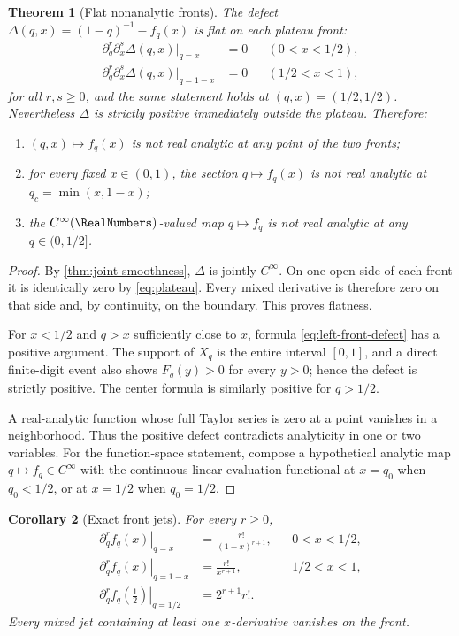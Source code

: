 \documentclass[11pt,oneside]{article}
\newtheorem{theorem}{Theorem}[section]
\newtheorem{corollary}[theorem]{Corollary}
\theoremstyle{definition}
\theoremstyle{remark}
\begin{document}
\begin{theorem}[Flat nonanalytic fronts]
\label{thm:flat-fronts}
The defect \(\Delta(q,x)=(1-q)^{-1}-f_q(x)\) is flat on each plateau front:
\begin{align}
 \partial_q^r\partial_x^s\Delta(q,x)\big|_{q=x}&=0
 &&(0<x<1/2),
 \label{eq:left-front-flat}\\
 \partial_q^r\partial_x^s\Delta(q,x)\big|_{q=1-x}&=0
 &&(1/2<x<1),
 \label{eq:right-front-flat}
\end{align}
for all \(r,s\ge0\), and the same statement holds at \((q,x)=(1/2,1/2)\).
Nevertheless \(\Delta\) is strictly positive immediately outside the plateau.  Therefore:

\begin{enumerate}
\item \((q,x)\mapsto f_q(x)\) is not real analytic at any point of the two fronts;
\item for every fixed \(x\in(0,1)\), the section \(q\mapsto f_q(x)\) is not real analytic at
\(q_c=\min(x,1-x)\);
\item the \(C^\infty(\RealNumbers)\)-valued map \(q\mapsto f_q\) is not real analytic at any
\(q\in(0,1/2]\).
\end{enumerate}
\end{theorem}

\begin{proof}
By \cref{thm:joint-smoothness}, \(\Delta\) is jointly \(C^\infty\).  On one open side of
each front it is identically zero by \eqref{eq:plateau}.  Every mixed derivative is therefore
zero on that side and, by continuity, on the boundary.  This proves flatness.

For \(x<1/2\) and \(q>x\) sufficiently close to \(x\), formula
\eqref{eq:left-front-defect} has a positive argument.  The support of \(X_q\) is the entire
interval \([0,1]\), and a direct finite-digit event also shows \(F_q(y)>0\) for every
\(y>0\); hence the defect is strictly positive.  The center formula is similarly positive
for \(q>1/2\).

A real-analytic function whose full Taylor series is zero at a point vanishes in a
neighborhood.  Thus the positive defect contradicts analyticity in one or two variables.  For
the function-space statement, compose a hypothetical analytic map
\(q\mapsto f_q\in C^\infty\) with the continuous linear evaluation functional at
\(x=q_0\) when \(q_0<1/2\), or at \(x=1/2\) when \(q_0=1/2\).
\end{proof}

\begin{corollary}[Exact front jets]
\label{cor:front-jets}
For every \(r\ge0\),
\begin{align}
 \left.\partial_q^r f_q(x)\right|_{q=x}
 &=\frac{r!}{(1-x)^{r+1}},&&0<x<1/2,
 \label{eq:left-front-qjet}\\
 \left.\partial_q^r f_q(x)\right|_{q=1-x}
 &=\frac{r!}{x^{r+1}},&&1/2<x<1,
 \label{eq:right-front-qjet}\\
 \left.\partial_q^r f_q\!\left(\frac12\right)\right|_{q=1/2}
 &=2^{r+1}r!.
 \label{eq:center-qjet}
\end{align}
Every mixed jet containing at least one \(x\)-derivative vanishes on the front.
\end{corollary}
\end{document}
